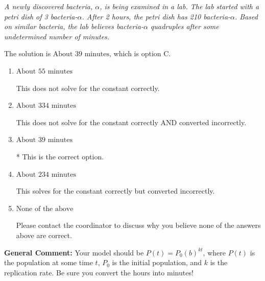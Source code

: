 \documentclass{extbook}[14pt]
\begin{document}
\begin{enumerate}
{\begin{center}
    \textit{ A newly discovered bacteria, $\alpha$, is being examined in a lab. The lab started with a petri dish of 3 bacteria-$\alpha$. After 2 hours, the petri dish has 210 bacteria-$\alpha$. Based on similar bacteria, the lab believes bacteria-$\alpha$ quadruples after some undetermined number of minutes. }
\end{center}


The solution is \( \text{About } 39 \text{ minutes} \), which is option C.\begin{enumerate}[label=\Alph*.]
\item \( \text{About } 55 \text{ minutes} \)

This does not solve for the constant correctly.
\item \( \text{About } 334 \text{ minutes} \)

This does not solve for the constant correctly AND converted incorrectly.
\item \( \text{About } 39 \text{ minutes} \)

* This is the correct option.
\item \( \text{About } 234 \text{ minutes} \)

This solves for the constant correctly but converted incorrectly.
\item \( \text{None of the above} \)

Please contact the coordinator to discuss why you believe none of the answers above are correct.
\end{enumerate}

\textbf{General Comment:} Your model should be $P(t) = P_0(b)^{kt}$, where $P(t)$ is the population at some time $t$, $P_0$ is the initial population, and $k$ is the replication rate. Be sure you convert the hours into minutes!
}
\end{enumerate}
\end{document}
